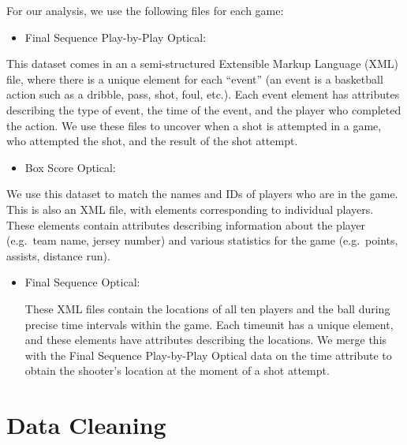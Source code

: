 \documentclass[12pt,twoside]{dukestatscithesis}
\providecommand{\tightlist}{%
  \setlength{\itemsep}{0pt}\setlength{\parskip}{0pt}}
\theoremstyle{definition}
\theoremstyle{definition}
\theoremstyle{definition}
\theoremstyle{remark}
\begin{document}
For our analysis, we use the following files for each game:
\begin{itemize}
\tightlist
\item
  Final Sequence Play-by-Play Optical:
\end{itemize}
This dataset comes in an a semi-structured Extensible Markup Language
(XML) file, where there is a unique element for each ``event'' (an event
is a basketball action such as a dribble, pass, shot, foul, etc.). Each
event element has attributes describing the type of event, the time of
the event, and the player who completed the action. We use these files
to uncover when a shot is attempted in a game, who attempted the shot,
and the result of the shot attempt.
\begin{itemize}
\tightlist
\item
  Box Score Optical:
\end{itemize}
We use this dataset to match the names and IDs of players who are in the
game. This is also an XML file, with elements corresponding to
individual players. These elements contain attributes describing
information about the player (e.g.~team name, jersey number) and various
statistics for the game (e.g.~points, assists, distance run).
\begin{itemize}
\item
  Final Sequence Optical:

  These XML files contain the locations of all ten players and the ball
  during precise time intervals within the game. Each timeunit has a
  unique element, and these elements have attributes describing the
  locations. We merge this with the Final Sequence Play-by-Play Optical
  data on the time attribute to obtain the shooter's location at the
  moment of a shot attempt.
\end{itemize}
\section{Data Cleaning}\label{data-cleaning}
\end{document}
